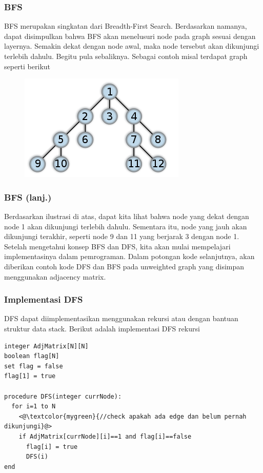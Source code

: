\begin{frame}
\frametitle{BFS}

\alert{BFS} merupakan singkatan dari Breadth-First Search. Berdasarkan namanya, dapat disimpulkan bahwa BFS akan menelusuri node pada graph sesuai dengan layernya. Semakin dekat dengan node awal, maka node tersebut akan dikunjungi terlebih dahulu. Begitu pula sebaliknya. Sebagai contoh misal terdapat graph seperti berikut

\begin{figure}
  \centering
  \includegraphics[width=6 cm]{asset/bfs.png}
\end{figure}

\end{frame}

\begin{frame}
\frametitle{BFS (lanj.)}

Berdasarkan ilustrasi di atas, dapat kita lihat bahwa node yang dekat dengan node 1 akan dikunjungi terlebih dahulu. Sementara itu, node yang jauh akan dikunjungi terakhir, seperti node 9 dan 11 yang berjarak 3 dengan node 1.
\newline\newline
Setelah mengetahui konsep BFS dan DFS, kita akan mulai mempelajari implementasinya dalam pemrograman. Dalam potongan kode selanjutnya, akan diberikan contoh kode DFS dan BFS pada unweighted graph yang disimpan menggunakan adjacency matrix.
\end{frame}

\begin{frame}[fragile]
\frametitle{Implementasi DFS}
DFS dapat diimplementasikan menggunakan rekursi atau dengan bantuan struktur data stack. Berikut adalah implementasi DFS rekursi\newline
\begin{lstlisting}
integer AdjMatrix[N][N]
boolean flag[N]
set flag = false
flag[1] = true

procedure DFS(integer currNode):
  for i=1 to N
    <@\textcolor{mygreen}{//check apakah ada edge dan belum pernah dikunjungi}@>
    if AdjMatrix[currNode][i]==1 and flag[i]==false
      flag[i] = true
      DFS(i)
end
        
\end{lstlisting}
\end{frame}

